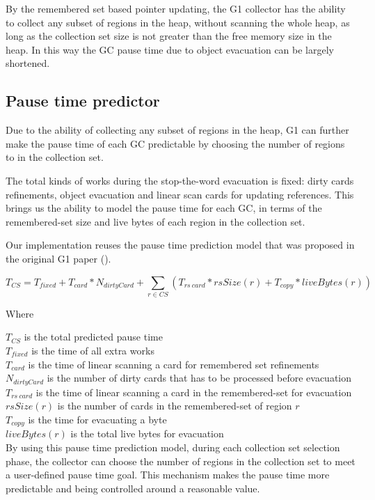 By the remembered set based pointer updating, the G1 collector has the ability to collect
any subset of regions in the heap, without scanning the whole heap, as long as the collection set size is not greater
than the free memory size in the heap. In this way the GC pause time due to object evacuation
can be largely shortened.

\subsection{Pause time predictor}

Due to the ability of collecting any subset of regions in the heap, G1 can further
make the pause time of each GC predictable by choosing the number of regions to in the collection set.

The total kinds of works during the stop-the-word evacuation is fixed:
dirty cards refinements, object evacuation and linear scan cards for updating references.
This brings us the ability to model the pause time for each GC, in terms of the remembered-set
size and live bytes of each region in the collection set.

Our implementation reuses the pause time prediction model that was proposed in the
original G1 paper (\cite{detlefs2004garbage}).

$$
T_{CS} = T_{fixed} + T_{card} * N_{dirtyCard} + \sum_{r\in CS} (T_{rs\ card} * rsSize(r) + T_{copy} * liveBytes(r))
$$

\noindent Where

\noindent$T_{CS}$ is the total predicted pause time\\
$T_{fixed}$ is the time of all extra works\\
$T_{card}$ is the time of linear scanning a card for remembered set refinements\\
$N_{dirtyCard}$ is the number of dirty cards that has to be processed before evacuation\\
$T_{rs\ card}$ is the time of linear scanning a card in the remembered-set for evacuation\\
$rsSize(r)$ is the number of cards in the remembered-set of region $r$\\
$T_{copy}$ is the time for evacuating a byte\\
$liveBytes(r)$ is the total live bytes for evacuation\\

By using this pause time prediction model, during each collection set selection phase,
the collector can choose the number of regions in the collection set to meet a
user-defined pause time goal. This mechanism makes the pause time more predictable
and being controlled around a reasonable value.

